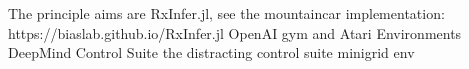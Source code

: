 
The principle aims are 
RxInfer.jl, see the mountaincar implementation: https://biaslab.github.io/RxInfer.jl
OpenAI gym and Atari Environments
DeepMind Control Suite \textcite{Deep-Mind-Control-Suite}
the distracting control suite 
minigrid env \textcite{minigrid}


